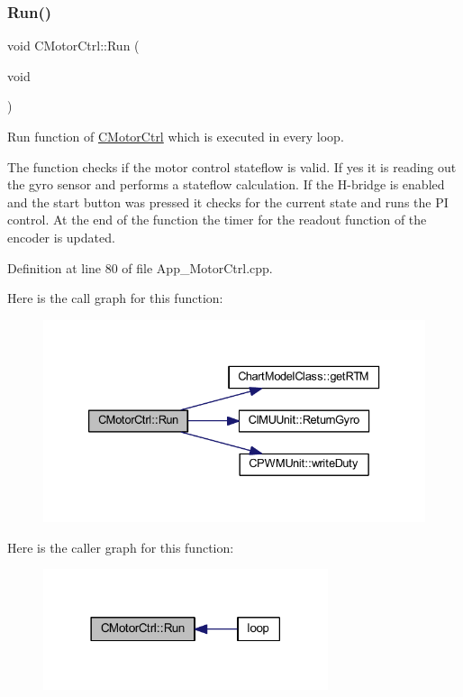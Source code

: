 \subsubsection{\texorpdfstring{Run()}{Run()}}
{\footnotesize\ttfamily void C\+Motor\+Ctrl\+::\+Run (\begin{DoxyParamCaption}\item[{void}]{ }\end{DoxyParamCaption})}



Run function of \mbox{\hyperlink{class_c_motor_ctrl}{C\+Motor\+Ctrl}} which is executed in every loop. 

The function checks if the motor control stateflow is valid. If yes it is reading out the gyro sensor and performs a stateflow calculation. If the H-\/bridge is enabled and the start button was pressed it checks for the current state and runs the PI control. At the end of the function the timer for the readout function of the encoder is updated. 

Definition at line 80 of file App\+\_\+\+Motor\+Ctrl.\+cpp.

Here is the call graph for this function\+:
\nopagebreak
\begin{figure}[H]
\begin{center}
\leavevmode
\includegraphics[width=333pt]{class_c_motor_ctrl_a63e5dd36be027fe8a5e1acee5c1322c8_cgraph}
\end{center}
\end{figure}
Here is the caller graph for this function\+:
\nopagebreak
\begin{figure}[H]
\begin{center}
\leavevmode
\includegraphics[width=237pt]{class_c_motor_ctrl_a63e5dd36be027fe8a5e1acee5c1322c8_icgraph}
\end{center}
\end{figure}
\mbox{\label{class_c_motor_ctrl_a0ae095bb6003ee63086361661f32ad3a}} 
